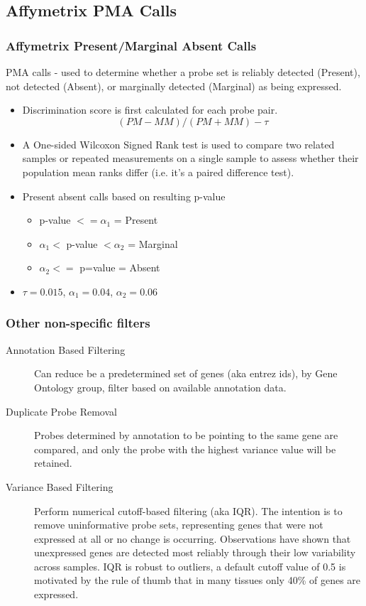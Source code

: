 \documentclass[pdf]{beamer}
\begin{document}
\subsection{Affymetrix PMA Calls}
\begin{frame} 
  \frametitle{Affymetrix Present/Marginal Absent Calls}
  PMA calls - used to determine whether a probe set is reliably detected (Present), not detected (Absent), or marginally detected (Marginal) as being expressed.
  \begin{itemize}
  \item Discrimination score is first calculated for each probe pair.
  \begin{equation}
  (PM-MM)/(PM+MM) - \tau
  \end{equation}
  \item A One-sided Wilcoxon Signed Rank test is used to compare two related samples or repeated measurements on a single sample to assess whether their population mean ranks differ (i.e. it's a paired difference test).
  \item Present absent calls based on resulting p-value
  \begin{itemize}
    \item p-value $<= \alpha_1$ = Present
    \item $\alpha_1 < $ p-value $ < \alpha_2$ = Marginal
    \item $\alpha_2 <= $ p=value = Absent
  \end{itemize}
  \item $\tau = 0.015$, $\alpha_1=0.04$, $\alpha_2=0.06$  
  \end{itemize}
\end{frame}

\begin{frame}
  \frametitle{Other non-specific filters}
  \begin{description}
  \item [Annotation Based Filtering] Can reduce be a predetermined set of genes (aka entrez ids), by Gene Ontology group, filter based on available annotation data. 
  \item [Duplicate Probe Removal] Probes determined by annotation to be pointing to the same gene are compared, and only the probe with the highest variance value will be retained.
  \item [Variance Based Filtering] Perform numerical cutoff-based filtering (aka IQR). The intention is to remove uninformative probe sets, representing genes that were not expressed at all or no change is occurring. Observations  have shown that unexpressed genes are detected most reliably through their low variability across samples. IQR is robust to outliers, a default cutoff value of 0.5 is motivated by the rule of thumb that in many tissues only 40\% of genes are expressed.
  \end{description}
\end{frame}
%
\end{document}
